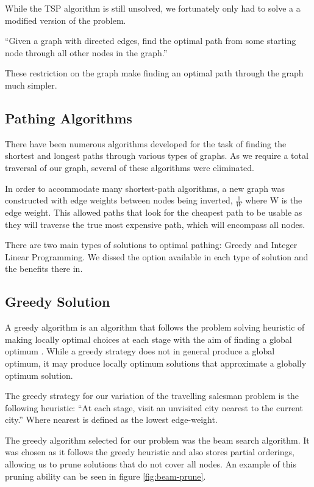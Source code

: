 \documentclass[bsc,frontabs,twoside,singlespacing,parskip,deptreport]{infthesis}     %
\begin{document}
While the TSP algorithm is still unsolved, we fortunately only had to solve a a modified version of the problem.\\

\begin{center}
  \enquote{Given a graph with directed edges, find the optimal path from some starting node through all other nodes in
  the graph.}
\end{center}

These restriction on the graph make finding an optimal path through the graph much simpler.


\subsection{Pathing Algorithms}
There have been numerous algorithms developed for the task of finding the shortest and longest paths through various types of graphs.
As we require a total traversal of our graph, several of these algorithms were eliminated.

In order to accommodate many shortest-path algorithms, a new graph was constructed with edge weights between nodes being inverted,
$\frac{1}{W}$ where W is the edge weight. This allowed paths that look for the cheapest path to be usable as they will traverse the
true most expensive path, which will encompass all nodes.

There are two main types of solutions to optimal pathing: Greedy and Integer Linear Programming.
We dissed the option available in each type of solution and the benefits there in.

\subsection{Greedy Solution}
A greedy algorithm is an algorithm that follows the problem solving heuristic of making locally optimal choices at each stage with the aim
of finding a global optimum \cite{black2004dictionary}.
While a greedy strategy does not in general produce a global optimum, it may produce locally optimum solutions that approximate a globally optimum solution.


The greedy strategy for our variation of the travelling salesman problem is the following heuristic:
``At each stage, visit an unvisited city nearest to the current city.''
Where nearest is defined as the lowest edge-weight.


The greedy algorithm selected for our problem was the beam search algorithm.
It was chosen as it follows the greedy heuristic and also stores partial orderings, allowing us to prune solutions that do not cover all nodes.
An example of this pruning ability can be seen in figure \ref{fig:beam-prune}.
\end{document}
